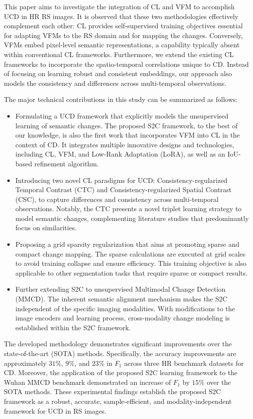 This paper aims to investigate the integration of CL and VFM to accomplish UCD in HR RS images. It is observed that these two methodologies effectively complement each other: CL provides self-supervised training objectives essential for adapting VFMs to the RS domain and for mapping the changes. Conversely, VFMs embed pixel-level semantic representations, a capability typically absent within conventional CL frameworks. Furthermore, we extend the existing CL frameworks to incorporate the spatio-temporal correlations unique to CD. Instead of focusing on learning robust and consistent embeddings, our approach also models the consistency and differences across multi-temporal observations.

The major technical contributions in this study can be summarized as follows:

\begin{itemize}
    \item Formulating a UCD framework that explicitly models the unsupervised learning of semantic changes. The proposed S2C framework, to the best of our knowledge, is also the first work that incorporates VFM into CL in the context of CD. It integrates multiple innovative designs and technologies, including CL, VFM, and Low-Rank Adaptation (LoRA), as well as an IoU-based refinement algorithm.
    \item Introducing two novel CL paradigms for UCD: Consistency-regularized Temporal Contrast (CTC) and Consistency-regularized Spatial Contrast (CSC), to capture differences and consistency across multi-temporal observations. Notably, the CTC presents a novel triplet learning strategy to model semantic changes, complementing literature studies that predominantly focus on similarities.
    \item Proposing a grid sparsity regularization that aims at promoting sparse and compact change mapping. The sparse calculations are executed at grid scales to avoid training collapse and ensure efficiency. This training objective is also applicable to other segmentation tasks that require sparse or compact results.
    \item Further extending S2C to unsupervised Multimodal Change Detection (MMCD). The inherent semantic alignment mechanism makes the S2C independent of the specific imaging modalities. With modifications to the image encoders and learning process, cross-modality change modeling is established within the S2C framework.
\end{itemize}

The developed methodology demonstrates significant improvements over the state-of-the-art (SOTA) methods. Specifically, the accuracy improvements are approximately $31\%$, $9\%$, and $23\%$ in $F_1$ across three HR benchmark datasets for CD. Moreover, the application of the proposed S2C learning framework to the Wuhan MMCD benchmark demonstrated an increase of $F_1$ by $15\%$ over the SOTA methods. These experimental findings establish the proposed S2C framework as a robust, accurate, sample-efficient, and modality-independent framework for UCD in RS images.